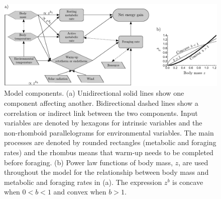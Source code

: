 \clearpage

\begin{figure}
\includegraphics[width=\textwidth]{fig1}
\caption{
    \setstretch{\stretchby}
    Model components.
    (a) Unidirectional solid lines show one component affecting another.
    Bidirectional dashed lines show a correlation or indirect link between the two components.
    Input variables are denoted by hexagons for intrinsic variables and the non-rhomboid parallelograms for environmental variables.
    The main processes are denoted by rounded rectangles (metabolic and foraging rates) and the rhombus means that warm-up needs to be completed before foraging.
    (b) Power law functions of body mass, $z$, are used throughout the model for the relationship between body mass and metabolic and foraging rates in (a).
    The expression $z^b$ is concave when $0 < b < 1$ and convex when $b > 1$.
}
\label{fig1}
\end{figure}

